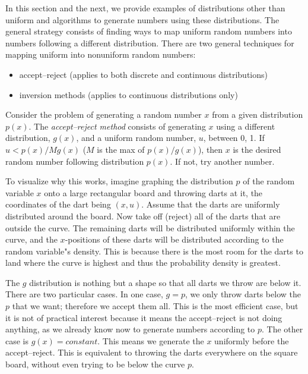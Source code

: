 \documentclass[justified, sixbynine]{tufte-book}
\theoremstyle{plain}%
\newtheorem * {corollary}{Corollary}
\theoremstyle{definition}
\theoremstyle{remark}
\newtheorem * {remark}{Remark}
\newtheorem * {note}{Note}
\begin{document}
\begin{fullwidth}

In this section and the next, we provide examples of distributions other than uniform and algorithms to generate numbers using these distributions. The general strategy consists of finding ways to map uniform random numbers into numbers following a different distribution. There are two general techniques for mapping uniform into nonuniform random numbers:

\begin{itemize}
\item accept--reject (applies to both discrete and continuous distributions)
\item inversion methods (applies to continuous distributions only)
\end{itemize}

Consider the problem of generating a random number $x$ from a given distribution $p(x)$. The {\it accept--reject method} consists of generating $x$ using a different distribution, $g(x)$, and a uniform random number, $u$, between 0, 1. If $u<p(x)/Mg(x)$ ($M$ is the max of $p(x)/g(x)$), then $x$ is the desired random number following distribution $p(x)$. If not, try another number.

To visualize why this works, imagine graphing the distribution $p$ of the random variable $x$ onto a large rectangular board and throwing darts at it, the coordinates of the dart being $(x, u)$. Assume that the darts are uniformly distributed around the board. Now take off (reject) all of the darts that are outside the curve. The remaining darts will be distributed uniformly within the curve, and the $x$-positions of these darts will be distributed according to the random variable"s density. This is because there is the most room for the darts to land where the curve is highest and thus the probability density is greatest.

The $g$ distribution is nothing but a shape so that all darts we throw are below it. There are two particular cases. In one case, $g=p$, we only throw darts below the $p$ that we want; therefore we accept them all. This is the most efficient case, but it is not of practical interest because it means the accept--reject is not doing anything, as we already know now to generate numbers according to $p$. The other case is $g(x) = constant$. This means we generate the $x$ uniformly before the accept--reject. This is equivalent to throwing the darts everywhere on the square board, without even trying to be below the curve $p$.


\end{fullwidth}
\end{document}
